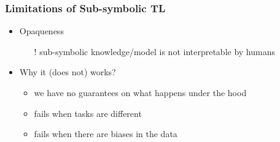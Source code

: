 \documentclass[presentation]{beamer}\mode<presentation>{\usetheme{blackAMSBolognaFC}}
\begin{document}
\begin{frame}%
\frametitle{Limitations of Sub-symbolic TL}

    \begin{itemize}
        \item Opaqueness~
        \begin{itemize}
            \item[!] sub-symbolic knowledge/model is \alert{not interpretable} by humans
        \end{itemize}

        \vfill

        \item Why it (does not) works?
        \begin{itemize}
            \item we have no guarantees on what happens under the hood
            \item fails when tasks are different
            \item fails when there are biases in the data
        \end{itemize}

    \end{itemize}

\end{frame}
\end{document}
